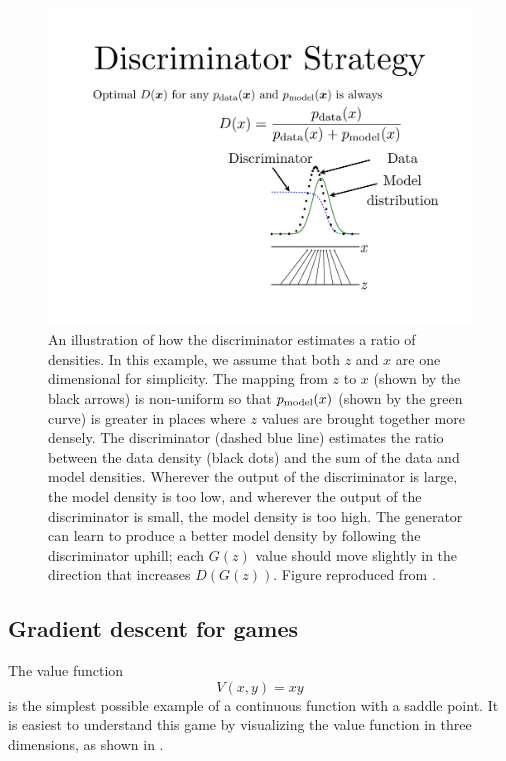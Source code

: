 \begin{figure}
\centering
\includegraphics[width=\figwidth]{ratio}
\caption{
An illustration of how the discriminator estimates a ratio of
densities.
In this example, we assume that both $z$ and $x$ are one dimensional
for simplicity.
The mapping from $z$ to $x$ (shown by the black arrows) is non-uniform so that $p_{\rm{model}}(x)$
(shown by the green curve) is
greater in places where $z$ values are brought together more densely.
The discriminator (dashed blue line) estimates the ratio between the data density (black dots)
and the sum of the data and model densities.
Wherever the output of the discriminator is large, the model density is too low, and wherever
the output of the discriminator is small, the model density is too high.
The generator can learn to produce a better model density by following the discriminator uphill;
each $G(z)$ value should move slightly in the direction that increases $D(G(z))$.
Figure reproduced from \citet{Goodfellow-et-al-NIPS2014-small}.
}
\label{fig:ratio}
\end{figure}


\subsection{Gradient descent for games}
\label{sec:xy_soln}

The value function
\[ V(x, y) = x y \]
is the simplest possible example of a continuous function with a saddle point.
It is easiest to understand this game by visualizing the value function in three
dimensions, as shown in .

